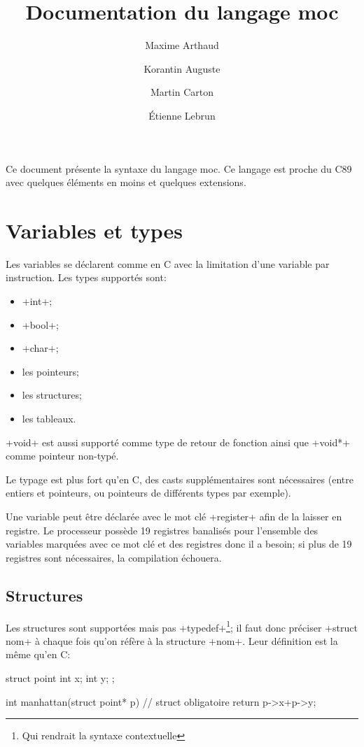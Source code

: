 \documentclass[a4paper]{article}
\author{
       Maxime Arthaud
  \and Korantin Auguste
  \and Martin Carton
  \and Étienne Lebrun
}
\title{Documentation du langage moc}
\begin{document}
  \maketitle
  \tableofcontents
  \newpage

  Ce document présente la syntaxe du langage moc. Ce langage est proche du C89
  avec quelques éléments en moins et quelques extensions.

  \section{Variables et types}
    Les variables se déclarent comme en C avec la limitation d'une variable par
    instruction. Les types supportés sont:
    \begin{itemize}
      \item \imoc+int+;
      \item \imoc+bool+;
      \item \imoc+char+;
      \item les pointeurs;
      \item les structures;
      \item les tableaux.
    \end{itemize}

    \imoc+void+ est aussi supporté comme type de retour de fonction ainsi que
    \imoc+void*+ comme pointeur non-typé.

    Le typage est plus fort qu'en C, des casts supplémentaires sont nécessaires
    (entre entiers et pointeurs, ou pointeurs de différents types par exemple).

    Une variable peut être déclarée avec le mot clé \imoc+register+ afin de la
    laisser en registre. Le processeur possède 19 registres banalisés pour
    l'ensemble des variables marquées avec ce mot clé et des registres donc il
    a besoin; si plus de 19 registres sont nécessaires, la compilation échouera.

    \subsection{Structures}
      Les structures sont supportées mais pas \imoc+typedef+\footnote{Qui
      rendrait la syntaxe contextuelle}; il faut donc préciser \imoc+struct nom+
      à chaque fois qu'on réfère à la structure \imoc+nom+. Leur définition est
      la même qu'en C:

      \begin{moc}
struct point {
    int x;
    int y;
};

int manhattan(struct point* p) { // struct obligatoire
    return p->x+p->y;
}
      \end{moc}
\end{document}
